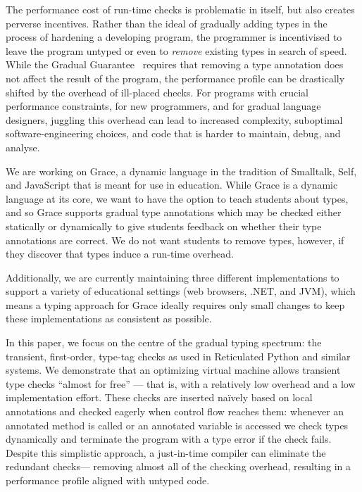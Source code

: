 The performance cost of run-time checks is problematic in itself,
but also creates perverse incentives. Rather than the ideal of
gradually adding types in the process of hardening a developing
program, the programmer is incentivised to leave the program untyped
or even to \textit{remove} existing types in search of speed.
%
While the Gradual Guarantee~\cite{XXXSiek2015} requires that
removing a type annotation does not affect the result of the
program, the performance profile can be drastically shifted by the
overhead of ill-placed checks.
%
For programs with crucial performance constraints, for new
programmers, and for gradual language designers, juggling this
overhead can lead to increased complexity, suboptimal
software-engineering choices, and code that is harder to maintain,
debug, and analyse.




We are working on Grace\citep{graceOnward12}, a dynamic language in
the tradition of Smalltalk\citep{bluebook}, Self\citep{Self}, and
JavaScript that is meant for use in
education\citep{graceSigcse13}.  While Grace is a dynamic language at
its core, we want to have the option to teach students about types,
and so Grace supports gradual type annotations which may be checked either
statically or dynamically to give students feedback on whether their
type annotations are correct.  We do not want students to remove
types, however, if they discover that types induce a run-time
overhead.

Additionally, we are currently maintaining three different
implementations to support a variety of educational settings
(web browsers, .NET, and JVM),
which means a typing approach for Grace ideally requires
only small changes to keep these implementations as consistent as
possible.


In this paper, we focus on the centre of the gradual typing
spectrum: the transient, first-order, type-tag checks as used in
Reticulated Python and similar systems. We demonstrate that an
optimizing virtual machine allows transient type checks ``almost for
free'' --- that is, with a
relatively low overhead and a low implementation effort. These checks
are inserted na\"ively based on local 
annotations and checked eagerly when control flow reaches them: 
whenever an annotated method is called or
an annotated variable is accessed
we check types dynamically and
terminate the program with a type error if the check fails.
Despite this simplistic approach, a just-in-time compiler can
eliminate the redundant checks---%
removing almost all of the checking overhead,
resulting in
a performance profile aligned with untyped code.

